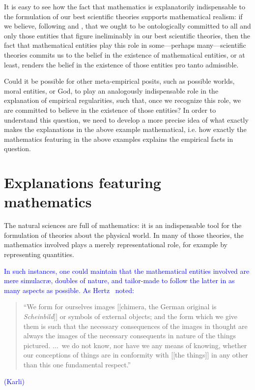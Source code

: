 \documentclass[a4paper,12pt]{article}
\newcommand{\karli}[1]{\textcolor{blue}{#1 (Karli)}}
\begin{document}
It is easy to see how the fact that mathematics is explanatorily indispensable to the formulation of our best scientific theories supports mathematical realism: if we believe, following \cite{Quine1981} and \cite{Putnam1979}, that we ought to be ontologically committed to all and only those entities that figure ineliminably in our best scientific theories, then the fact that mathematical entities play this role in some---perhaps many---scientific theories commits us to the belief in the existence of mathematical entities, or at least, renders the belief in the existence of those entities pro tanto admissible.

Could it be possible for other meta-empirical posits, such as possible worlds, moral entities, or God, to play an analogously indispensable role in the explanation of empirical regularities, such that, once we recognize this role, we are committed to believe in the existence of those entities? In order to understand this question, we need to develop a more precise idea of what exactly makes the explanations in the above example mathematical, i.e. how exactly the mathematics featuring in the above examples explains the empirical facts in question.


\section{Explanations featuring mathematics}

The natural sciences are full of mathematics: it is an indispensable tool for the formulation of theories about the physical world.
In many of those theories, the mathematics involved plays a merely representational role, for example by representing quantities.

\karli{
In such instances, one could maintain that the mathematical entities involved are mere simulacr\ae, doubles
\cite{Arthaud} of nature, and tailor-made to follow the latter in as many aspects as possible.
As Hertz~\cite[Introduction]{hertz-94,hertz-94e} noted:
\blockquote{ ``We form for ourselves images [[chimera, the German original is {\em Scheinbild}]] or symbols of external objects;
and the form which we give them is such that the necessary
consequences of the images in thought are always the images of
the necessary consequents in nature of the things pictured.
$\ldots$~we do not
know, nor have we any means of knowing, whether our conceptions
of things are in conformity with [[the things]] in any other
than this one fundamental respect.''}
}
\end{document}
